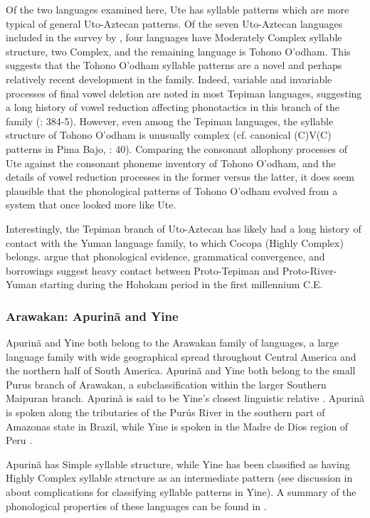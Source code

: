   Of the two languages examined here, Ute has syllable patterns which are more typical of general Uto-Aztecan patterns. Of the seven Uto-Aztecan languages included in the survey by \citet{Maddieson2013a}, four languages have Moderately Complex syllable structure, two Complex, and the remaining language is Tohono O’odham. This suggests that the Tohono O’odham syllable patterns are a novel and perhaps relatively recent development in the family. Indeed, variable and invariable processes of final vowel deletion are noted in most Tepiman languages, suggesting a long history of vowel reduction affecting phonotactics in this branch of the family (\citealt{ShaulHill1998}: 384-5). However, even among the Tepiman languages, the syllable structure of Tohono O’odham is unusually complex (cf. canonical (C)V(C) patterns in Pima Bajo,  \citealt{EstradaFernández2014}: 40). Comparing the consonant allophony processes of Ute against the consonant phoneme inventory of Tohono O’odham, and the details of vowel reduction processes in the former versus the latter, it does seem plausible that the phonological patterns of Tohono O’odham evolved from a system that once looked more like Ute.

  Interestingly, the Tepiman branch of Uto-Aztecan has likely had a long history of contact with the Yuman language family, to which Cocopa (Highly Complex) belongs. \citet{ShaulHill1998} argue that phonological evidence, grammatical convergence, and borrowings suggest heavy contact between Proto-Tepiman and Proto-River-Yuman starting during the Hohokam period in the first millennium C.E.

\subsubsection{{Arawakan:} {Apurinã} {and} {Yine}}\label{sec:8.4.3.2}

  Apurinã and Yine both belong to the Arawakan family of languages, a large language family with wide geographical spread throughout Central America and the northern half of South America. Apurinã and Yine both belong to the small Purus branch of Arawakan, a subclassification within the larger Southern Maipuran branch. Apurinã is said to be Yine’s closest linguistic relative \citep{Facundes2002}. Apurinã is spoken along the tributaries of the Purús River in the southern part of Amazonas state in Brazil, while Yine is spoken in the Madre de Dios region of Peru \citep{Aikhenvald1999}.

  Apurinã has Simple syllable structure, while Yine has been classified as having Highly Complex syllable structure as an intermediate pattern (see discussion in  about complications for classifying syllable patterns in Yine). A summary of the phonological properties of these languages can be found in .


